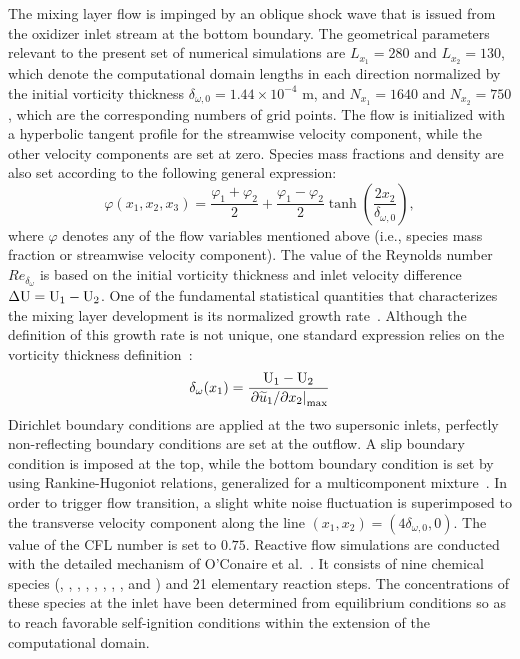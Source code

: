 \documentclass[conf]{new-aiaa}
\newcommand*{\dwz}{\delta_{\omega,0}}
\begin{document}
%
The mixing layer flow is impinged by an oblique shock wave that is issued from the oxidizer inlet stream at the bottom boundary.
%
The geometrical parameters relevant to the present set of numerical simulations are $L_{x_1}=280$ and $L_{x_2}=130$, which denote the computational domain lengths in each direction normalized by the initial vorticity thickness $\dwz=1.44\times 10^{-4}$ m, and $N_{x_1}=1640$ and $N_{x_2}=750$, which are the corresponding numbers of grid points.
%
The flow is initialized with a hyperbolic tangent profile for the streamwise velocity component, while the other velocity components are set at zero. Species mass fractions and density are also set according to the following general expression:
%
\begin{equation}
\varphi(x_1,x_2,x_3)= \frac{\varphi_1+\varphi_2}{2}+\frac{\varphi_1-\varphi_2}{2}\tanh\left(\frac{2x_2}{\dwz}\right),
\end{equation}
%
where $\varphi$ denotes any of the flow variables mentioned above (i.e., species mass fraction or streamwise velocity component).
%
The value of the Reynolds number ${Re_{\delta_{\omega}}}$ is based on the initial vorticity thickness and inlet velocity difference $\Delta \ce{U}=\ce{U}_1-\ce{U}_2$. 
%
One of the fundamental statistical quantities that characterizes the mixing layer development is its normalized growth rate~\cite{ramshaw2000simple}.
%
Although the definition of this growth rate is not unique, one standard expression relies on the vorticity thickness definition~\cite{pantano2003mixing}:
%
\begin{equation}
\delta_{\omega}(x_1)=\frac{\ce{U}_1-\ce{U}_2}{\left. {\partial\widetilde{u}_1}/{\partial x_2}\right\vert_{\max}}
\end{equation}
%
Dirichlet boundary conditions are applied at the two supersonic inlets, perfectly non-reflecting boundary conditions are set at the outflow.
%
A slip boundary condition is imposed at the top, while the bottom boundary condition is set by using Rankine-Hugoniot relations, generalized for a multicomponent mixture~\cite{mitchell1982general}.
%
In order to trigger flow transition, a slight white noise fluctuation is superimposed to the transverse velocity component along the line $(x_1,x_2)=(4\dwz,0)$.
%
The value of the {CFL} number is set to $0.75$.
%
Reactive flow simulations are conducted with the detailed mechanism of O'Conaire et al.~\cite{o2004comprehensive}. It consists of nine chemical species (, , , , , , , , and ) and 21 elementary reaction steps.
%
The  concentrations of these species at the inlet have been determined from equilibrium conditions so as to reach favorable self-ignition conditions within the extension of the computational domain. 
\end{document}
